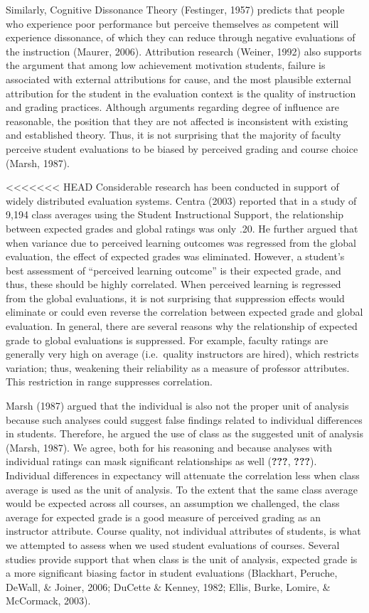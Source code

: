 \documentclass[man]{apa6}
\theoremstyle{definition}
\theoremstyle{definition}
\theoremstyle{definition}
\theoremstyle{remark}
\begin{document}
Similarly, Cognitive Dissonance Theory (Festinger, 1957) predicts that
people who experience poor performance but perceive themselves as
competent will experience dissonance, of which they can reduce through
negative evaluations of the instruction (Maurer, 2006). Attribution
research (Weiner, 1992) also supports the argument that among low
achievement motivation students, failure is associated with external
attributions for cause, and the most plausible external attribution for
the student in the evaluation context is the quality of instruction and
grading practices. Although arguments regarding degree of influence are
reasonable, the position that they are not affected is inconsistent with
existing and established theory. Thus, it is not surprising that the
majority of faculty perceive student evaluations to be biased by
perceived grading and course choice (Marsh, 1987).

\textless{}\textless{}\textless{}\textless{}\textless{}\textless{}\textless{}
HEAD Considerable research has been conducted in support of widely
distributed evaluation systems. Centra (2003) reported that in a study
of 9,194 class averages using the Student Instructional Support, the
relationship between expected grades and global ratings was only .20. He
further argued that when variance due to perceived learning outcomes was
regressed from the global evaluation, the effect of expected grades was
eliminated. However, a student's best assessment of \enquote{perceived
learning outcome} is their expected grade, and thus, these should be
highly correlated. When perceived learning is regressed from the global
evaluations, it is not surprising that suppression effects would
eliminate or could even reverse the correlation between expected grade
and global evaluation. In general, there are several reasons why the
relationship of expected grade to global evaluations is suppressed. For
example, faculty ratings are generally very high on average
(i.e.~quality instructors are hired), which restricts variation; thus,
weakening their reliability as a measure of professor attributes. This
restriction in range suppresses correlation.

Marsh (1987) argued that the individual is also not the proper unit of
analysis because such analyses could suggest false findings related to
individual differences in students. Therefore, he argued the use of
class as the suggested unit of analysis (Marsh, 1987). We agree, both
for his reasoning and because analyses with individual ratings can mask
significant relationships as well ({\textbf{???}}, {\textbf{???}}).
Individual differences in expectancy will attenuate the correlation less
when class average is used as the unit of analysis. To the extent that
the same class average would be expected across all courses, an
assumption we challenged, the class average for expected grade is a good
measure of perceived grading as an instructor attribute. Course quality,
not individual attributes of students, is what we attempted to assess
when we used student evaluations of courses. Several studies provide
support that when class is the unit of analysis, expected grade is a
more significant biasing factor in student evaluations (Blackhart,
Peruche, DeWall, \& Joiner, 2006; DuCette \& Kenney, 1982; Ellis, Burke,
Lomire, \& McCormack, 2003).
\end{document}
